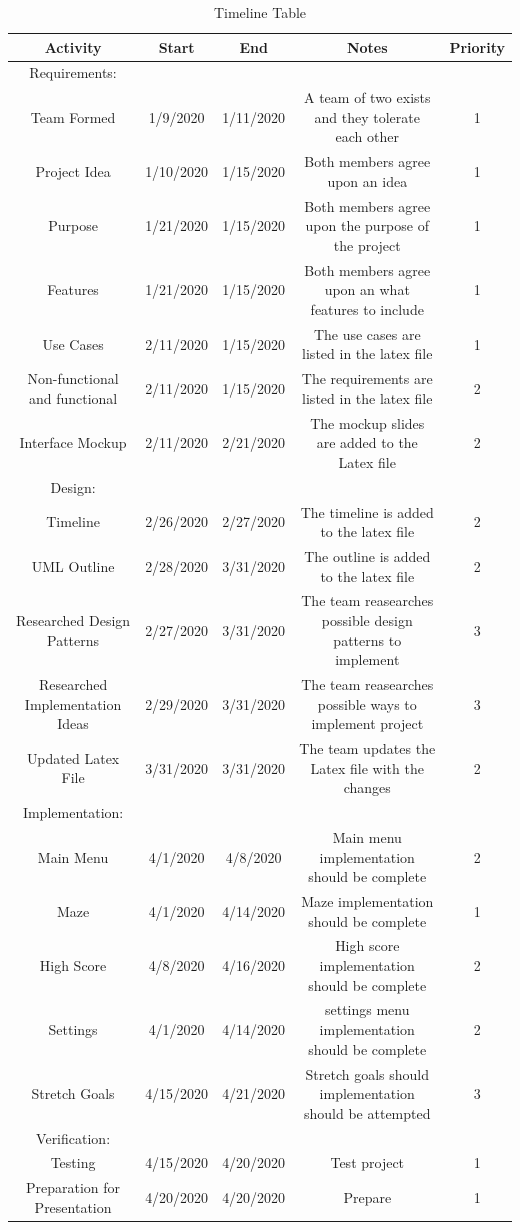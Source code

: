\documentclass[10pt,conference,onecolumn,compsoc]{IEEEtran}
\begin{document}
\begin{table}
\centering
\begin{tabular}{|c|c|c|c|c|}
\hline
 Activity & Start & End & Notes & Priority \\
\hline \hline
Requirements: \\
\hline \hline
Team Formed & 1/9/2020 & 1/11/2020 & A team of two exists and they tolerate each other & 1\\
Project Idea & 1/10/2020 & 1/15/2020 & Both members agree upon an idea & 1\\
Purpose & 1/21/2020 & 1/15/2020 & Both members agree upon the purpose of the project & 1\\
Features & 1/21/2020 & 1/15/2020 & Both members agree upon an what features to include& 1\\
Use Cases & 2/11/2020 & 1/15/2020 & The use cases are listed in the latex file & 1\\
Non-functional and functional & 2/11/2020 & 1/15/2020 & The requirements are listed in the latex file & 2\\
Interface Mockup & 2/11/2020 & 2/21/2020 & The mockup slides are added to the Latex file & 2\\
\hline \hline
Design: \\
\hline \hline 
Timeline & 2/26/2020 & 2/27/2020 & The timeline is added to the latex file & 2\\
UML Outline & 2/28/2020 & 3/31/2020 & The outline is added to the latex file & 2\\
Researched Design Patterns& 2/27/2020& 3/31/2020 & The team reasearches possible design patterns to implement & 3\\
Researched Implementation Ideas & 2/29/2020& 3/31/2020 & The team reasearches possible ways to implement project & 3\\
Updated Latex File& 3/31/2020 & 3/31/2020 & The team updates the Latex file with the changes&2\\
\hline \hline
Implementation: \\
\hline \hline 
Main Menu &4/1/2020& 4/8/2020& Main menu implementation should be complete& 2\\
Maze&4/1/2020 & 4/14/2020 & Maze implementation should be complete& 1\\
High Score& 4/8/2020&4/16/2020& High score implementation should be complete& 2\\
Settings&4/1/2020& 4/14/2020& settings menu implementation should be complete& 2\\
Stretch Goals& 4/15/2020&4/21/2020& Stretch goals should implementation should be attempted & 3\\
\hline \hline
Verification: \\
\hline \hline 
Testing & 4/15/2020&4/20/2020&Test project&1\\
Preparation for Presentation & 4/20/2020&4/20/2020& Prepare&1\\
\hline
\end{tabular}
\caption{Timeline Table}
\label{tab:timeline}
\end{table}
\clearpage
\end{document}
